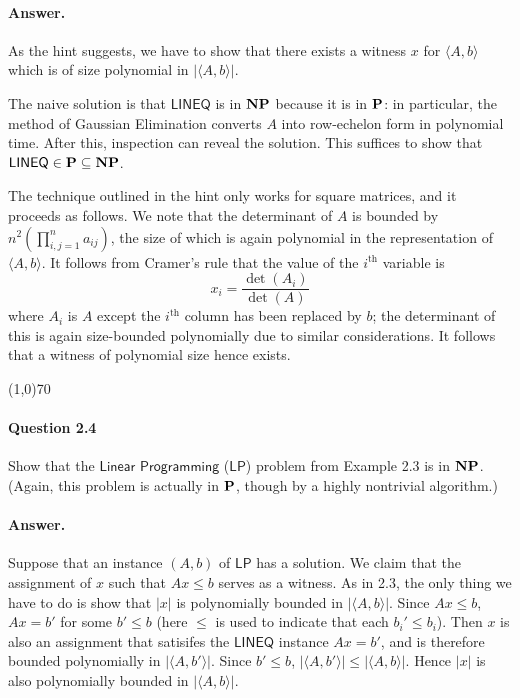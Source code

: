 \paragraph{Answer.} As the hint suggests, we have to show that there exists a witness $x$ for $\langle A, b\rangle$ which is of size polynomial in $|\langle A, b\rangle|$. 

The naive solution is that $\mathsf{LINEQ}$ is in $\mathbf{NP}$ because it is in $\mathbf{P}$: in particular, the method of Gaussian Elimination converts $A$ into row-echelon form in polynomial time. After this, inspection can reveal the solution. This suffices to show that $\mathsf{LINEQ}\in\mathbf{P}\subseteq\mathbf{NP}$.

The technique outlined in the hint only works for square matrices, and it proceeds as follows. We note that the determinant of $A$ is bounded by $n^2\left(\prod_{i,j=1}^{n}a_{ij}\right)$, the size of which is again polynomial in the representation of $\langle A, b\rangle$. It follows from Cramer's rule that the value of the $i^{\text{th}}$ variable is
\begin{equation*}
	x_i=\frac{\det(A_i)}{\det(A)}
\end{equation*}
where $A_i$ is $A$ except the $i^{\text{th}}$ column has been replaced by $b$; the determinant of this is again size-bounded polynomially due to similar considerations. It follows that a witness of polynomial size hence exists.

\begin{center}
	\line(1,0){70}
\end{center}

\paragraph{Question 2.4} Show that the $\mathsf{Linear}$ $\mathsf{Programming}$ ($\mathsf{LP}$) problem from Example 2.3 is in $\mathbf{NP}$. (Again, this problem is actually in $\mathbf{P}$, though by a highly nontrivial algorithm.)

\paragraph{Answer.} Suppose that an instance $(A,b)$ of $\mathsf{LP}$ has a solution. We claim that the assignment of $x$ such that $Ax\leq b$ serves as a witness. As in 2.3, the only thing we have to do is show that $|x|$ is polynomially bounded in $|\langle A, b\rangle|$. Since $Ax\leq b$, $Ax=b'$ for some $b'\leq b$ (here $\leq$ is used to indicate that each $b_i'\leq b_i$). Then $x$ is also an assignment that satisifes the $\mathsf{LINEQ}$ instance $Ax=b'$, and is therefore bounded polynomially in $|\langle A,b'\rangle|$. Since $b'\leq b$, $|\langle A,b'\rangle|\leq|\langle A,b\rangle|$. Hence $|x|$ is also polynomially bounded in $|\langle A,b\rangle|$.


